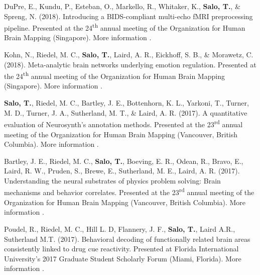 \documentclass[10pt]{article}
\newcommand{\textlink}[3][blue]{\href{#2}{\color{#1}{#3}}}
\begin{document}
\begin{hangparas}{.25in}{1}
	\bigskip

	DuPre, E., Kundu, P., Esteban, O., Markello, R., Whitaker, K.,
	\textbf{Salo, T.}, \& Spreng, N. (2018).
	Introducing a BIDS-compliant multi-echo fMRI preprocessing pipeline.
	Presented at the 24\textsuperscript{th} annual meeting of the Organization
	for Human Brain Mapping (Singapore).
	More information
	\textlink{https://ww5.aievolution.com/hbm1801/index.cfm?do=abs.viewAbs&abs=2789}{here}.

	\bigskip

	Kohn, N., Riedel, M. C., \textbf{Salo, T.}, Laird, A. R., Eickhoff, S. B.,
	\& Morawetz, C. (2018).
	Meta-analytic brain networks underlying emotion regulation.
	Presented at the 24\textsuperscript{th} annual meeting of the Organization
	for Human Brain Mapping (Singapore).
	More information
	\textlink{https://ww5.aievolution.com/hbm1801/index.cfm?do=abs.viewAbs&abs=1262}{here}.

	\bigskip

	\textbf{Salo, T.}, Riedel, M. C., Bartley, J. E., Bottenhorn, K. L., Yarkoni, T.,
	Turner, M. D., Turner, J. A., Sutherland, M. T., \& Laird, A. R. (2017).
	A quantitative evaluation of Neurosynth's annotation methods. Presented at
	the 23\textsuperscript{rd} annual meeting of the Organization for Human Brain
	Mapping (Vancouver, British Columbia).
	More information
	\textlink{https://nbclab.github.io/posters/salo-neurosynth-poster}{here}.

	\bigskip

	Bartley, J. E., Riedel, M. C., \textbf{Salo, T.}, Boeving, E. R., Odean, R.,
	Bravo, E., Laird, R. W., Pruden, S., Brewe, E., Sutherland, M. E.,
	Laird, A. R. (2017).
	Understanding the neural substrates of physics problem solving: Brain
	mechanisms and behavior correlates. Presented at the 23\textsuperscript{rd}
	annual meeting of the Organization for Human Brain Mapping (Vancouver, British
	Columbia).
	More information
	\textlink{https://nbclab.github.io/posters/bartley-physics-poster}{here}.

	\bigskip

	Poudel, R.,  Riedel, M. C., Hill L. D, Flannery, J. F., \textbf{Salo, T.},
	Laird A.R., Sutherland M.T. (2017).
	Behavioral decoding of functionally related brain areas consistently linked
	to drug cue reactivity.
	Presented at Florida International University's 2017 Graduate Student
	Scholarly Forum (Miami, Florida).
	More information
	\textlink{https://nbclab.github.io/posters/poudel-cue-reactivity-poster}{here}.


\end{hangparas}
\end{document}
